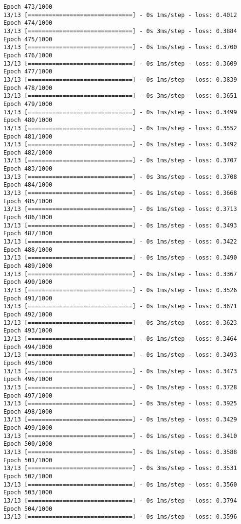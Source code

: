 \documentclass[11pt]{article}
\begin{document}
\begin{Verbatim}[commandchars=\\\{\}]
Epoch 473/1000
13/13 [==============================] - 0s 1ms/step - loss: 0.4012
Epoch 474/1000
13/13 [==============================] - 0s 3ms/step - loss: 0.3884
Epoch 475/1000
13/13 [==============================] - 0s 1ms/step - loss: 0.3700
Epoch 476/1000
13/13 [==============================] - 0s 1ms/step - loss: 0.3609
Epoch 477/1000
13/13 [==============================] - 0s 1ms/step - loss: 0.3839
Epoch 478/1000
13/13 [==============================] - 0s 3ms/step - loss: 0.3651
Epoch 479/1000
13/13 [==============================] - 0s 1ms/step - loss: 0.3499
Epoch 480/1000
13/13 [==============================] - 0s 1ms/step - loss: 0.3552
Epoch 481/1000
13/13 [==============================] - 0s 1ms/step - loss: 0.3492
Epoch 482/1000
13/13 [==============================] - 0s 1ms/step - loss: 0.3707
Epoch 483/1000
13/13 [==============================] - 0s 3ms/step - loss: 0.3708
Epoch 484/1000
13/13 [==============================] - 0s 1ms/step - loss: 0.3668
Epoch 485/1000
13/13 [==============================] - 0s 1ms/step - loss: 0.3713
Epoch 486/1000
13/13 [==============================] - 0s 1ms/step - loss: 0.3493
Epoch 487/1000
13/13 [==============================] - 0s 1ms/step - loss: 0.3422
Epoch 488/1000
13/13 [==============================] - 0s 1ms/step - loss: 0.3490
Epoch 489/1000
13/13 [==============================] - 0s 1ms/step - loss: 0.3367
Epoch 490/1000
13/13 [==============================] - 0s 1ms/step - loss: 0.3526
Epoch 491/1000
13/13 [==============================] - 0s 1ms/step - loss: 0.3671
Epoch 492/1000
13/13 [==============================] - 0s 3ms/step - loss: 0.3623
Epoch 493/1000
13/13 [==============================] - 0s 1ms/step - loss: 0.3464
Epoch 494/1000
13/13 [==============================] - 0s 1ms/step - loss: 0.3493
Epoch 495/1000
13/13 [==============================] - 0s 1ms/step - loss: 0.3473
Epoch 496/1000
13/13 [==============================] - 0s 1ms/step - loss: 0.3728
Epoch 497/1000
13/13 [==============================] - 0s 3ms/step - loss: 0.3925
Epoch 498/1000
13/13 [==============================] - 0s 1ms/step - loss: 0.3429
Epoch 499/1000
13/13 [==============================] - 0s 1ms/step - loss: 0.3410
Epoch 500/1000
13/13 [==============================] - 0s 1ms/step - loss: 0.3588
Epoch 501/1000
13/13 [==============================] - 0s 3ms/step - loss: 0.3531
Epoch 502/1000
13/13 [==============================] - 0s 1ms/step - loss: 0.3560
Epoch 503/1000
13/13 [==============================] - 0s 1ms/step - loss: 0.3794
Epoch 504/1000
13/13 [==============================] - 0s 1ms/step - loss: 0.3596

\end{Verbatim}
\end{document}
